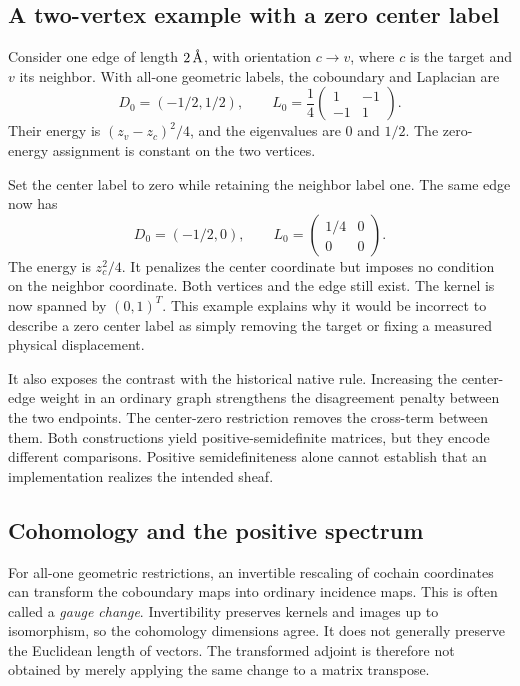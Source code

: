 \subsection{A two-vertex example with a zero center label}
Consider one edge of length $2\,\text{\AA}$, with orientation $c\to v$, where $c$ is the target and $v$ its neighbor. With all-one geometric labels, the coboundary and Laplacian are
\begin{equation}
D_0=(-1/2,1/2),\qquad
L_0=\frac14\begin{pmatrix}1&-1\\-1&1\end{pmatrix}.
\end{equation}
Their energy is $(z_v-z_c)^2/4$, and the eigenvalues are $0$ and $1/2$. The zero-energy assignment is constant on the two vertices.

Set the center label to zero while retaining the neighbor label one. The same edge now has
\begin{equation}
D_0=(-1/2,0),\qquad L_0=\begin{pmatrix}1/4&0\\0&0\end{pmatrix}.
\end{equation}
The energy is $z_c^2/4$. It penalizes the center coordinate but imposes no condition on the neighbor coordinate. Both vertices and the edge still exist. The kernel is now spanned by $(0,1)^T$. This example explains why it would be incorrect to describe a zero center label as simply removing the target or fixing a measured physical displacement.

It also exposes the contrast with the historical native rule. Increasing the center-edge weight in an ordinary graph strengthens the disagreement penalty between the two endpoints. The center-zero restriction removes the cross-term between them. Both constructions yield positive-semidefinite matrices, but they encode different comparisons. Positive semidefiniteness alone cannot establish that an implementation realizes the intended sheaf.

\subsection{Cohomology and the positive spectrum}
For all-one geometric restrictions, an invertible rescaling of cochain coordinates can transform the coboundary maps into ordinary incidence maps. This is often called a \emph{gauge change}. Invertibility preserves kernels and images up to isomorphism, so the cohomology dimensions agree. It does not generally preserve the Euclidean length of vectors. The transformed adjoint is therefore not obtained by merely applying the same change to a matrix transpose.

